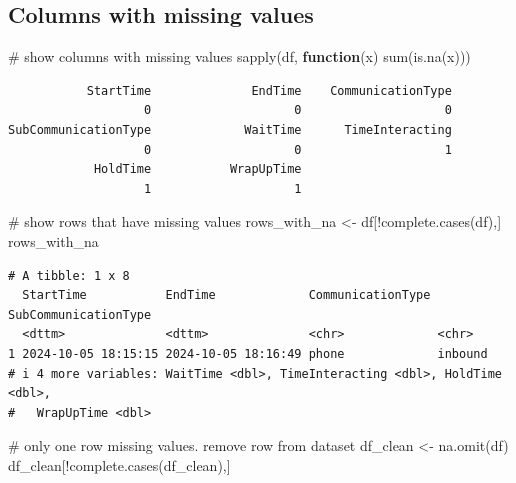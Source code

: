 \documentclass[
  letterpaper,
  DIV=11,
  numbers=noendperiod]{scrartcl}
\newenvironment{Shaded}{\begin{snugshade}}{\end{snugshade}}
\newcommand{\CommentTok}[1]{\textcolor[rgb]{0.37,0.37,0.37}{#1}}
\newcommand{\ControlFlowTok}[1]{\textcolor[rgb]{0.00,0.23,0.31}{\textbf{#1}}}
\newcommand{\FunctionTok}[1]{\textcolor[rgb]{0.28,0.35,0.67}{#1}}
\newcommand{\NormalTok}[1]{\textcolor[rgb]{0.00,0.23,0.31}{#1}}
\newcommand{\OtherTok}[1]{\textcolor[rgb]{0.00,0.23,0.31}{#1}}
\newcommand{\SpecialCharTok}[1]{\textcolor[rgb]{0.37,0.37,0.37}{#1}}
\begin{document}
\subsection{Columns with missing
values}\label{columns-with-missing-values}

\begin{Shaded}
\begin{Highlighting}[]
\CommentTok{\# show columns with missing values}
\FunctionTok{sapply}\NormalTok{(df, }\ControlFlowTok{function}\NormalTok{(x) }\FunctionTok{sum}\NormalTok{(}\FunctionTok{is.na}\NormalTok{(x)))}
\end{Highlighting}
\end{Shaded}

\begin{verbatim}
           StartTime              EndTime    CommunicationType 
                   0                    0                    0 
SubCommunicationType             WaitTime      TimeInteracting 
                   0                    0                    1 
            HoldTime           WrapUpTime 
                   1                    1 
\end{verbatim}

\begin{Shaded}
\begin{Highlighting}[]
\CommentTok{\# show rows that have missing values}
\NormalTok{rows\_with\_na }\OtherTok{\textless{}{-}}\NormalTok{ df[}\SpecialCharTok{!}\FunctionTok{complete.cases}\NormalTok{(df),]}
\NormalTok{rows\_with\_na}
\end{Highlighting}
\end{Shaded}

\begin{verbatim}
# A tibble: 1 x 8
  StartTime           EndTime             CommunicationType SubCommunicationType
  <dttm>              <dttm>              <chr>             <chr>               
1 2024-10-05 18:15:15 2024-10-05 18:16:49 phone             inbound             
# i 4 more variables: WaitTime <dbl>, TimeInteracting <dbl>, HoldTime <dbl>,
#   WrapUpTime <dbl>
\end{verbatim}

\begin{Shaded}
\begin{Highlighting}[]
\CommentTok{\# only one row missing values. remove row from dataset}
\NormalTok{df\_clean }\OtherTok{\textless{}{-}} \FunctionTok{na.omit}\NormalTok{(df)}
\NormalTok{df\_clean[}\SpecialCharTok{!}\FunctionTok{complete.cases}\NormalTok{(df\_clean),]}
\end{Highlighting}
\end{Shaded}
\end{document}
